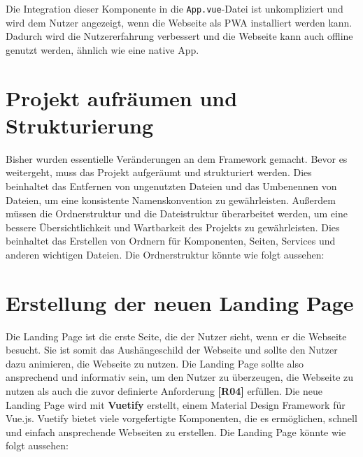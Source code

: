 Die Integration dieser Komponente in die \texttt{App.vue}-Datei ist unkompliziert und wird dem Nutzer angezeigt, wenn die Webseite als \acs{PWA} installiert werden kann. Dadurch wird die Nutzererfahrung verbessert und die Webseite kann auch offline genutzt werden, ähnlich wie eine native App. \cite{vite-plugin-pwa}

\section{Projekt aufräumen und Strukturierung}

Bisher wurden essentielle Veränderungen an dem Framework gemacht.
Bevor es weitergeht, muss das Projekt aufgeräumt und strukturiert werden.
Dies beinhaltet das Entfernen von ungenutzten Dateien und das Umbenennen von Dateien, um eine konsistente Namenskonvention zu gewährleisten.
Außerdem müssen die Ordnerstruktur und die Dateistruktur überarbeitet werden, um eine bessere Übersichtlichkeit und Wartbarkeit des Projekts zu gewährleisten.
Dies beinhaltet das Erstellen von Ordnern für Komponenten, Seiten, Services und anderen wichtigen Dateien.
Die Ordnerstruktur könnte wie folgt aussehen:


\section{Erstellung der neuen Landing Page}

Die Landing Page ist die erste Seite, die der Nutzer sieht, wenn er die Webseite besucht.
Sie ist somit das Aushängeschild der Webseite und sollte den Nutzer dazu animieren, die Webseite zu nutzen.
Die Landing Page sollte also ansprechend und informativ sein, um den Nutzer zu überzeugen, die Webseite zu nutzen als auch die zuvor definierte Anforderung \textbf{[R04]} erfüllen.
Die neue Landing Page wird mit \textbf{Vuetify} erstellt, einem Material Design Framework für Vue.js.
Vuetify bietet viele vorgefertigte Komponenten, die es ermöglichen, schnell und einfach ansprechende Webseiten zu erstellen.
Die Landing Page könnte wie folgt aussehen:


